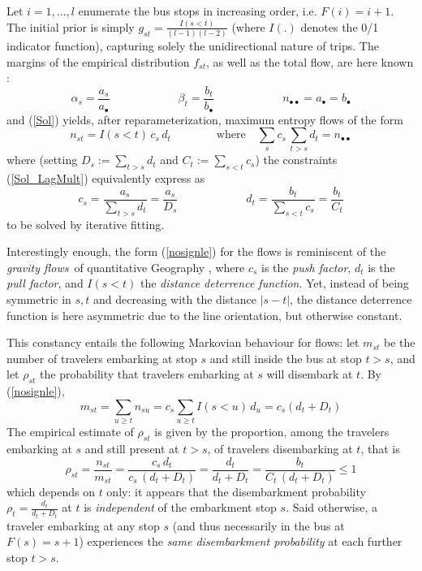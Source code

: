 \documentclass{bmcart}
\begin{document}
Let  $i=1,\ldots, l$ enumerate the bus stops in increasing order,  i.e. $F(i)=i+1$. The initial prior is simply $g_{st}=\frac{I(s<t)}{(l-1)(l-2)}$ (where $I(.)$ denotes the 0/1  indicator function), capturing solely the unidirectional nature of trips. The margins of the empirical distribution $f_{st}$, as well as the total flow, are here known : 
\begin{displaymath}
\alpha_s=\frac{a_s}{a_\bullet}\qquad\qquad\qquad \beta_t=\frac{b_t}{b_\bullet}\qquad\qquad\qquad n_{\bullet\bullet}=a_{\bullet}=b_\bullet
\end{displaymath}
and (\ref{Sol}) yields, after reparameterization, maximum entropy flows of the form
\begin{equation}
\label{nosignle}
n_{st}=I(s<t)\, c_s\, d_t \qquad\qquad\mbox{where}\quad \sum_{s}c_s\, \sum_{t>s}d_t=n_{\bullet\bullet}
\end{equation}
where (setting $D_s:=\sum_{t>s}d_t$ and $C_t:=\sum_{s<t}c_s$) the constraints (\ref{Sol_LagMult}) equivalently express as 
\begin{equation}
\label{dis embarking constraints}
c_s=\frac{a_s}{\sum_{t>s}d_t}=\frac{a_s}{D_s}
\qquad\qquad\qquad
d_t=\frac{b_t}{\sum_{s<t}c_s}=\frac{b_t}{C_t}
\end{equation}
to be solved by iterative fitting. 

Interestingly enough, the form (\ref{nosignle}) for the flows is reminiscent of the {\em gravity flows} of quantitative Geography \cite{wilson1967statistical}  \cite{erlander1990gravity} \cite{bavaud2002quasi} \cite{Thomas-Agnan2021}, where 
$c_s$ is the {\em push factor}, $d_t$ is the {\em pull factor}, and $I(s<t)$ the {\em distance deterrence function}. Yet, instead of  
being symmetric in $s,t$ and decreasing with the distance $|s-t|$, the distance deterrence function is here asymmetric due to the line orientation, but otherwise constant. 

This constancy entails the following Markovian behaviour for flows: let $m_{st}$ be the number of travelers embarking at stop $s$ and still inside the bus at stop $t>s$, and let $\rho_{st}$ the probability that travelers embarking at $s$ will disembark at $t$. By (\ref{nosignle}), 
\begin{displaymath}
m_{st}=\sum_{u\ge t}n_{su}=c_s \sum_{u\ge t} I(s<u)\, d_u =c_s (d_t+D_t) 
\end{displaymath}
The empirical estimate of $\rho_{st}$ is given by the proportion, among the travelers embarking at $s$ and 
 still present at $t>s$,  of travelers disembarking at $t$, that is 
\begin{displaymath}
\rho_{st}=\frac{n_{st}}{m_{st}}=\frac{c_s\,  d_t}{c_s\,  (d_t+D_t)}=\frac{d_t}{d_t+D_t}=\frac{b_t}{C_t\, (d_t+D_t)}\le 1
\end{displaymath}
which depends on $t$ only: it appears that the disembarkment probability $\rho_t=\frac{d_t}{d_t+D_t}$ at $t$ is {\em independent} of the embarkment stop $s$. Said otherwise, a traveler embarking at any stop $s$ (and thus necessarily in the bus at $F(s)=s+1$) experiences the {\em same disembarkment probability} at each further stop $t>s$. 
\end{document}
